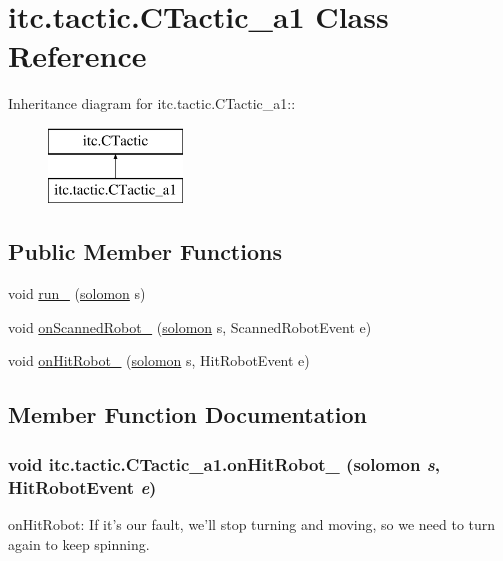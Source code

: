 \hypertarget{classitc_1_1tactic_1_1_c_tactic__a1}{
\section{itc.tactic.CTactic\_\-a1 Class Reference}
\label{classitc_1_1tactic_1_1_c_tactic__a1}
}
Inheritance diagram for itc.tactic.CTactic\_\-a1::\begin{figure}[H]
\begin{center}
\leavevmode
\includegraphics[height=2cm]{classitc_1_1tactic_1_1_c_tactic__a1}
\end{center}
\end{figure}
\subsection*{Public Member Functions}
\begin{DoxyCompactItemize}
\item 
void \hyperlink{classitc_1_1tactic_1_1_c_tactic__a1_a83dba0cef825a91cd2818e3246a77a76}{run\_\-} (\hyperlink{classitc_1_1solomon}{solomon} s)
\item 
void \hyperlink{classitc_1_1tactic_1_1_c_tactic__a1_aab5562fb9a1ed47924bdf4c1d6eb10de}{onScannedRobot\_\-} (\hyperlink{classitc_1_1solomon}{solomon} s, ScannedRobotEvent e)
\item 
void \hyperlink{classitc_1_1tactic_1_1_c_tactic__a1_ac61ce5dba31a140581a5f6f2dd74d73b}{onHitRobot\_\-} (\hyperlink{classitc_1_1solomon}{solomon} s, HitRobotEvent e)
\end{DoxyCompactItemize}


\subsection{Member Function Documentation}
\hypertarget{classitc_1_1tactic_1_1_c_tactic__a1_ac61ce5dba31a140581a5f6f2dd74d73b}{
\subsubsection[{onHitRobot\_\-}]{\setlength{\rightskip}{0pt plus 5cm}void itc.tactic.CTactic\_\-a1.onHitRobot\_\- ({\bf solomon} {\em s}, \/  HitRobotEvent {\em e})}}
\label{classitc_1_1tactic_1_1_c_tactic__a1_ac61ce5dba31a140581a5f6f2dd74d73b}
onHitRobot: If it's our fault, we'll stop turning and moving, so we need to turn again to keep spinning. 

